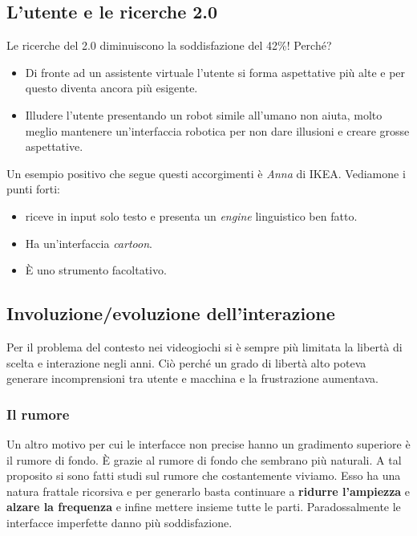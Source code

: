 		\subsection{L'utente e le ricerche 2.0}
			Le ricerche del 2.0 diminuiscono la soddisfazione del 42\%! Perché?
			\begin{itemize}
				\item Di fronte ad un assistente virtuale l'utente si forma aspettative più alte e per questo diventa ancora più esigente.
				\item Illudere l'utente presentando un robot simile all'umano non aiuta, molto meglio mantenere un'interfaccia robotica per non dare illusioni e creare grosse aspettative.
			\end{itemize}
			Un esempio positivo che segue questi accorgimenti è \emph{Anna} di IKEA. Vediamone i punti forti:
			\begin{itemize}
				\item riceve in input solo testo e presenta un \emph{engine} linguistico ben fatto. 
				\item Ha un'interfaccia \emph{cartoon}.
				\item È uno strumento facoltativo.
			\end{itemize}
		
		\subsection{Involuzione/evoluzione dell'interazione}
			Per il problema del contesto nei videogiochi si è sempre più limitata la libertà di scelta e interazione negli anni. Ciò perché un grado di libertà alto poteva generare incomprensioni tra utente e macchina e la frustrazione aumentava.
		
			\subsubsection{Il rumore}
				Un altro motivo per cui le interfacce non precise hanno un gradimento superiore è il rumore di fondo. È grazie al rumore di fondo che sembrano più naturali. A tal proposito si sono fatti studi sul rumore che costantemente viviamo. Esso ha una natura frattale ricorsiva e per generarlo basta continuare a \textbf{ridurre l'ampiezza} e \textbf{alzare la frequenza} e infine mettere insieme tutte le parti.
				Paradossalmente le interfacce imperfette danno più soddisfazione.